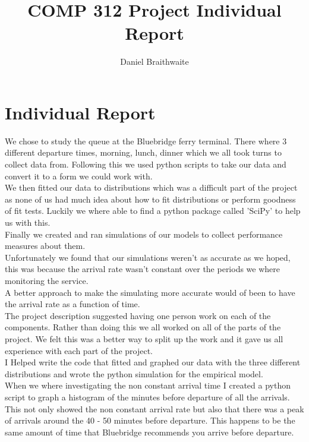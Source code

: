 \documentclass[a4paper, 12pt]{article}
\title{COMP 312 Project Individual Report}
\author{Daniel Braithwaite}
\begin{document}
	\maketitle
	\newpage
  	
	\section{Individual Report}
		We chose to study the queue at the Bluebridge ferry terminal. There where 3 different departure times, morning, lunch, dinner which we all took turns to collect data from. Following this we used python scripts to take our data and convert it to a form we could work with.\\
		
		We then fitted our data to distributions which was a difficult part of the project as none of us had much idea about how to fit distributions or perform goodness of fit tests. Luckily we where able to find a python package called 'SciPy' to help us with this.\\
		
		Finally we created and ran simulations of our models to collect performance measures about them.\\
		
		Unfortunately we found that our simulations weren't as accurate as we hoped, this was because the arrival rate wasn't constant over the periods we where monitoring the service.\\
		
		A better approach to make the simulating more accurate would of been to have the arrival rate as a function of time.\\
		
		The project description suggested having one person work on each of the components. Rather than doing this we all worked on all of the parts of the project. We felt this was a better way to split up the work and it gave us all experience with each part of the project.\\
		
		I Helped write the code that fitted and graphed our data with the three different distributions and wrote the python simulation for the empirical model.\\
		
		When we where investigating the non constant arrival time I created a python script to graph a histogram of the minutes before departure of all the arrivals. This not only showed the non constant arrival rate but also that there was a peak of arrivals around the 40 - 50 minutes before departure. This happens to be the same amount of time that Bluebridge recommends you arrive before departure.\\
		
\end{document}
